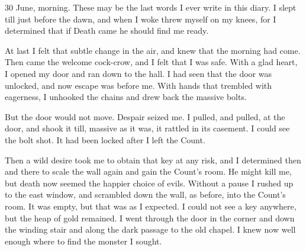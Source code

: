 \begin{diary}{30 June, morning.}
These may be the last words I ever write in this diary. I slept till just before the dawn, and when I woke threw myself on my knees, for I determined that if Death came he should find me ready.

At last I felt that subtle change in the air, and knew that the morning had come. Then came the welcome cock-crow, and I felt that I was safe. With a glad heart, I opened my door and ran down to the hall. I had seen that the door was unlocked, and now escape was before me. With hands that trembled with eagerness, I unhooked the chains and drew back the massive bolts.

But the door would not move. Despair seized me. I pulled, and pulled, at the door, and shook it till, massive as it was, it rattled in its casement. I could see the bolt shot. It had been locked after I left the Count.

Then a wild desire took me to obtain that key at any risk, and I determined then and there to scale the wall again and gain the Count's room. He might kill me, but death now seemed the happier choice of evils. Without a pause I rushed up to the east window, and scrambled down the wall, as before, into the Count's room. It was empty, but that was as I expected. I could not see a key anywhere, but the heap of gold remained. I went through the door in the corner and down the winding stair and along the dark passage to the old chapel. I knew now well enough where to find the monster I sought.


\end{diary}
